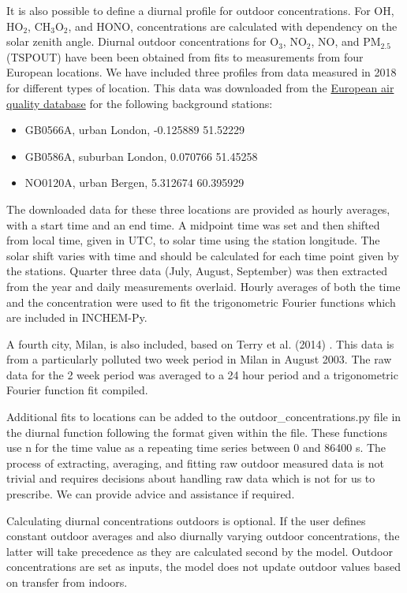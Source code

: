 \documentclass[a4paper]{refart}
\begin{document}
It is also possible to define a diurnal profile for outdoor concentrations. For OH, HO$_2$, CH$_3$O$_2$, and HONO, concentrations are calculated with dependency on the solar zenith angle. Diurnal outdoor concentrations for O$_3$, NO$_2$, NO, and PM$_{2.5}$ (TSPOUT) have been been obtained from fits to measurements from four European locations. We have included three profiles from data measured in 2018 for different types of location. This data was downloaded from the \href{https://aqportal.discomap.eea.europa.eu/products/data-viewers/statistical-viewer-expert/}{European air quality database} for the following background stations:
\begin{itemize}
    \item GB0566A, urban London, -0.125889	51.52229
    \item GB0586A, suburban London, 0.070766	51.45258
    \item NO0120A, urban Bergen, 5.312674	60.395929
\end{itemize} 
The downloaded data for these three locations are provided as hourly averages, with a start time and an end time. A midpoint time was set and then shifted from local time, given in UTC, to solar time using the station longitude. The solar shift varies with time and should be calculated for each time point given by the stations. Quarter three data (July, August, September) was then extracted from the year and daily measurements overlaid. Hourly averages of both the time and the concentration were used to fit the trigonometric Fourier functions which are included in INCHEM-Py. 

A fourth city, Milan, is also included, based on Terry et al. (2014) \cite{Terry2014}. This data is from a particularly polluted two week period in Milan in August 2003. The raw data for the 2 week period was averaged to a 24 hour period and a trigonometric Fourier function fit compiled. 

Additional fits to locations can be added to the outdoor\_concentrations.py file in the diurnal function following the format given within the file. These functions use n for the time value as a repeating time series between 0 and 86400 s. The process of extracting, averaging, and fitting raw outdoor measured data is not trivial and requires decisions about handling raw data which is not for us to prescribe. We can provide advice and assistance if required.

Calculating diurnal concentrations outdoors is optional. If the user defines constant outdoor averages and also diurnally varying outdoor concentrations, the latter will take precedence as they are calculated second by the model. Outdoor concentrations are set as inputs, the model does not update outdoor values based on transfer from indoors.
\end{document}
